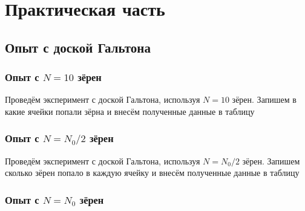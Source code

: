 \section{Практическая часть}
\subsection{Опыт с доской Гальтона}

\subsubsection{Опыт с $N = 10$ зёрен}

Проведём эксперимент с доской Гальтона, используя $N = 10$ зёрен. Запишем в какие ячейки попали зёрна и внесём полученные данные в таблицу

\subsubsection{Опыт с $N = N_0 / 2$ зёрен}

Проведём эксперимент с доской Гальтона, используя $N = N_0 / 2$ зёрен. Запишем сколько зёрен попало в каждую ячейку и внесём полученные данные в таблицу


\subsubsection{Опыт с $N = N_0$ зёрен}